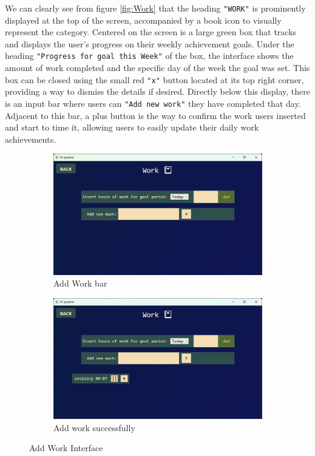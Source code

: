 \documentclass[12pt]{article}
\begin{document}
We can clearly see from figure \ref{fig:Work} that the heading \texttt{"WORK"} is
prominently displayed at the top of the screen, accompanied by a book icon to
visually represent the category. Centered on the screen is a large green box that
tracks and displays the user's progress on their weekly achievement goals. Under
the heading \texttt{"Progress for goal this Week"} of the box, the interface
shows the amount of work completed and the specific day of the week the goal was
set. This box can be closed using the small red \texttt{"x"} button located at
its top right corner, providing a way to dismiss the details if desired. Directly
below this display, there is an input bar where users can \texttt{"Add new work"}
they have completed that day. Adjacent to this bar, a plus button is the way to
confirm the work users inserted and start to time it, allowing users to easily
update their daily work achievements.\par

\begin{figure}[!ht]
  \centering
  \begin{subfigure}{0.4\linewidth}
    \includegraphics[width=\linewidth]{Add Work}
    \caption{Add Work bar}
    \label{fig:Add_Work}
  \end{subfigure}
  \hfill
  \begin{subfigure}{0.4\linewidth}
    \includegraphics[width=\linewidth]{Add Work 2}
    \caption{Add work successfully}
    \label{fig:Add_Work_2}
  \end{subfigure}
  \caption{Add Work Interface}
  \label{fig:Work_Interface}
\end{figure}
\end{document}
